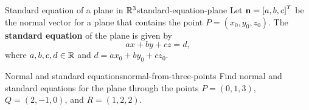 \begin{definition}{Standard equation of a plane in $\mathbb{R}^3$}{standard-equation-plane}
  Let $\vect{n} = \mat{a,b,c}^T$ be the normal vector for a plane that
  contains the point $P = (x_0, y_0, z_0)$. The \textbf{standard
    equation}%
   of the plane is given by
  \begin{equation*}
    ax + by + cz = d,
  \end{equation*}
  where $a,b,c,d \in \mathbb{R}$ and $d = ax_0 + by_0 + cz_0$.
\end{definition}

\begin{example}{Normal and standard equations}{normal-from-three-points}
  Find normal and standard equations for the plane through the points
  $P = (0,1,3)$, $Q=(2,-1,0)$, and $R=(1,2,2)$.
\end{example}

